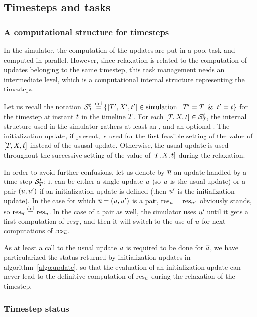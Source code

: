 \subsection{Timesteps and tasks}

\subsubsection{A computational structure for timesteps}

In the simulator, the computation of the updates are put in a pool task and computed in parallel. However, since relaxation is related to the computation of updates belonging to the same timestep, this task management needs an intermediate level, which is a computational internal structure representing the timesteps.

Let us recall the notation $\DftTS \EqDef \Sets{\DI\DftTTL\DftVVar\DftIInst \in \mbox{simulation}}{\DftTTL = \DftTL \And \DftIInst=\DftInst}$ for the timestep at instant $t$ in the timeline $T$. For each ${{\left[T,X,t\right]}} \in {{{\cal S}_{T}^{t}}}$, the internal structure used in the simulator gathers at least an , and an optional . The initialization update, if present, is used for the first feasible setting of the value of ${{\left[T,X,t\right]}}$ instead of the ususal update. Otherwise, the usual update is used throughout the successive setting of the value of ${{\left[T,X,t\right]}}$ during the relaxation.

In order to avoid further confusions, let us denote by $\overline{u}$ an update handled by a time step ${{{\cal S}_{T}^{t}}}$: it can be either a single update $u$ (so $u$ is the usual update) or a pair ${\left({u},{u'}\right)}$ if an initialization update is defined (then $u'$ is the initialization update). In the case for which $\overline{u} = {\left({u},{u'}\right)}$ is a pair, $\mathrm{res}_{u} = \mathrm{res}_{u'}$ obviously stands, so $\mathrm{res}_{\overline{u}} \stackrel{\mathrm{def}}{=} \mathrm{res}_{u}$. In the case of a pair as well, the simulator uses $u'$ until it gets a first computation of $\mathrm{res}_{\overline{u}}$, and then it will switch to the use of $u$ for next computations of $\mathrm{res}_{\overline{u}}$.

As at least a call to the usual update $u$ is required to be done for $\overline{u}$, we have particularized the status returned by initialization updates in algorithm~\ref{algo:update}, so that the evaluation of an initialization update can never lead to the definitive computation of $\mathrm{res}_{u}$ during the relaxation of the timestep.

\subsubsection{Timestep status}

